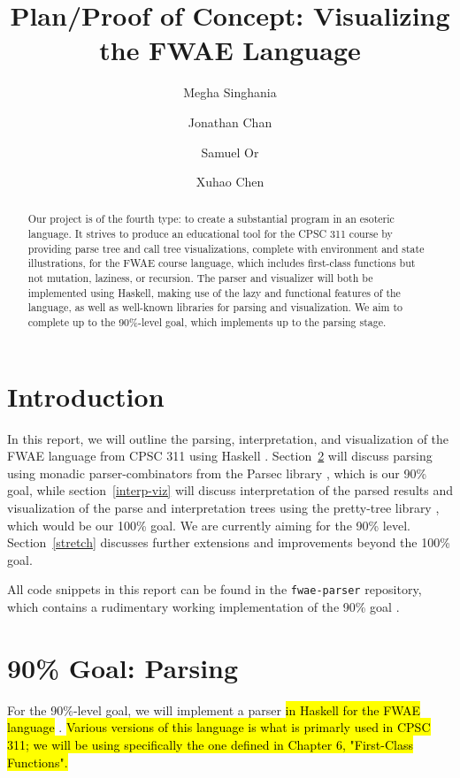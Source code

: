 \documentclass[format=acmlarge, review=false, nonacm=false, screen=true]{acmart}
\begin{document}
\title{Plan/Proof of Concept: Visualizing the FWAE Language}

\author{Megha Singhania}
\author{Jonathan Chan}
\author{Samuel Or}
\author{Xuhao Chen}

\begin{abstract}
\vspace{0.75em}

Our project is of the fourth type: to create a substantial program in an esoteric language. It strives to produce an educational tool for the CPSC 311 course by providing parse tree and call tree visualizations, complete with environment and state illustrations, for the FWAE course language, which includes first-class functions but not mutation, laziness, or recursion. The parser and visualizer will both be implemented using Haskell, making use of the lazy and functional features of the language, as well as well-known libraries for parsing and visualization. We aim to complete up to the 90\%-level goal, which implements up to the parsing stage.
\end{abstract}

\maketitle

\setcounter{section}{-1}
\section{Introduction}
In this report, we will outline the parsing, interpretation, and visualization of the FWAE language from CPSC 311 using Haskell \cite{inclass6}. Section~\ref{parsing} will discuss parsing using monadic parser-combinators from the Parsec library \cite{parsec}, which is our 90\% goal, while section~\ref{interp-viz} will discuss interpretation of the parsed results and visualization of the parse and interpretation trees using the pretty-tree library \cite{pretty-tree}, which would be our 100\% goal. We are currently aiming for the 90\% level. Section~\ref{stretch} discusses further extensions and improvements beyond the 100\% goal.

All code snippets in this report can be found in the \texttt{fwae-parser} repository, which contains a rudimentary working implementation of the 90\% goal \cite{fwae-parser}.

\section{90\% Goal: Parsing}\label{parsing}
For the 90\%-level goal, we will implement a parser \hl{in Haskell for the FWAE language} \cite{fwae}. \hl{Various versions of this language is what is primarly used in CPSC 311; we will be using specifically the one defined in Chapter 6, "First-Class Functions".} 
\end{document}
